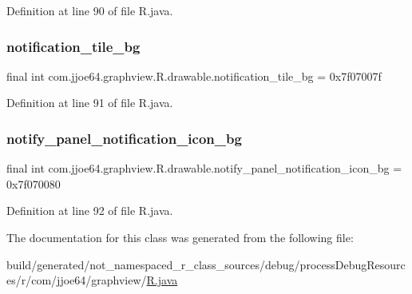 Definition at line 90 of file R.\+java.

\mbox{\label{classcom_1_1jjoe64_1_1graphview_1_1_r_1_1drawable_a1a7e77810cb6cf6c149d3fd56153c240}} 
\subsubsection{\texorpdfstring{notification\_tile\_bg}{notification\_tile\_bg}}
{\footnotesize\ttfamily final int com.\+jjoe64.\+graphview.\+R.\+drawable.\+notification\+\_\+tile\+\_\+bg = 0x7f07007f\hspace{0.3cm}{\ttfamily [static]}}



Definition at line 91 of file R.\+java.

\mbox{\label{classcom_1_1jjoe64_1_1graphview_1_1_r_1_1drawable_a6717bfdb0e1cb8bc4d33a72cf8b68b6e}} 
\subsubsection{\texorpdfstring{notify\_panel\_notification\_icon\_bg}{notify\_panel\_notification\_icon\_bg}}
{\footnotesize\ttfamily final int com.\+jjoe64.\+graphview.\+R.\+drawable.\+notify\+\_\+panel\+\_\+notification\+\_\+icon\+\_\+bg = 0x7f070080\hspace{0.3cm}{\ttfamily [static]}}



Definition at line 92 of file R.\+java.



The documentation for this class was generated from the following file\+:\begin{DoxyCompactItemize}
\item 
build/generated/not\+\_\+namespaced\+\_\+r\+\_\+class\+\_\+sources/debug/process\+Debug\+Resources/r/com/jjoe64/graphview/\mbox{\hyperlink{com_2jjoe64_2graphview_2_r_8java}{R.\+java}}\end{DoxyCompactItemize}
